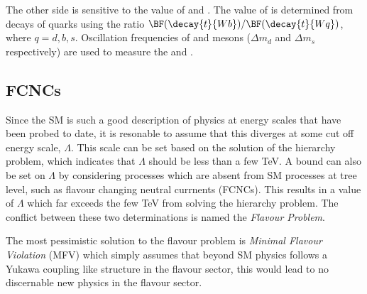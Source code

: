 The other side is sensitive to the value of  and .
The value of  is determined from decays of \tquark quarks using the ratio
$\BF(\decay{t}{Wb})/\BF(\decay{t}{Wq})$, where $q=d,b,s$.
Oscillation frequencies of \Bd and \Bs mesons ($\Delta m_d$ and $\Delta m_s$ respectively) are used
to measure the  and .




\subsection{FCNCs}
Since the SM is such a good description of physics at energy scales that have been probed to date,
it is resonable to assume that this diverges at some cut off energy scale, $\Lambda$.
This scale can be set based on the solution of the hierarchy problem, which indicates that
$\Lambda$ should be less than a few TeV.
A bound can also be set on $\Lambda$ by considering processes which are absent from SM processes at
tree level, such as flavour changing neutral currnents (FCNCs).
This results in a value of $\Lambda$ which far exceeds the few TeV from solving the hierarchy
problem.
The conflict between these two determinations is named the \emph{Flavour Problem}.

The most pessimistic solution to the flavour problem is \emph{Minimal Flavour Violation} (MFV)
which simply assumes that beyond SM physics follows a Yukawa coupling like structure in the flavour
sector, this would lead to no discernable new physics in the flavour sector.






%





